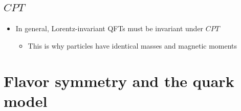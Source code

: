 \documentclass[11pt]{article}
\begin{document}
\subsection{$CPT$}
\begin{itemize}
  \item In general, Lorentz-invariant QFTs must be invariant under $CPT$
  \begin{itemize}
    \item This is why particles have identical masses and magnetic moments
  \end{itemize}
\end{itemize}

\section{Flavor symmetry and the quark model}
\end{document}

